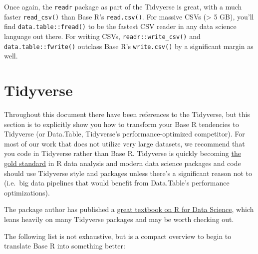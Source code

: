 \documentclass[]{book}
\begin{document}
Once again, the \texttt{readr} package as part of the Tidvyerse is
great, with a much faster \texttt{read\_csv()} than Base R's
\texttt{read.csv()}. For massive CSVs (\textgreater{} 5 GB), you'll find
\texttt{data.table::fread()} to be the fastest CSV reader in any data
science language out there. For writing CSVs,
\texttt{readr::write\_csv()} and \texttt{data.table::fwrite()} outclass
Base R's \texttt{write.csv()} by a significant margin as well.

\section{Tidyverse}\label{tidyverse}

Throughout this document there have been references to the Tidyverse,
but this section is to explicitly show you how to transform your Base R
tendencies to Tidyverse (or Data.Table, Tidyverse's
performance-optimized competitor). For most of our work that does not
utilize very large datasets, we recommend that you code in Tidyverse
rather than Base R. Tidyverse is quickly becoming
\href{https://rviews.rstudio.com/2017/06/08/what-is-the-tidyverse/}{the
gold standard} in R data analysis and modern data science packages and
code should use Tidyverse style and packages unless there's a
significant reason not to (i.e.~big data pipelines that would benefit
from Data.Table's performance optimizations).

The package author has published a \href{https://r4ds.had.co.nz/}{great
textbook on R for Data Science}, which leans heavily on many Tidyverse
packages and may be worth checking out.

The following list is not exhaustive, but is a compact overview to begin
to translate Base R into something better:
\end{document}
